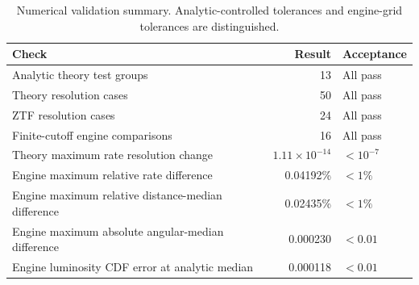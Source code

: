 \begin{table}[H]\centering\small
\renewcommand{\arraystretch}{1.15}
\caption{Numerical validation summary. Analytic-controlled tolerances and engine-grid tolerances are distinguished.}
\begin{tabular}{@{}lrl@{}}
\toprule
Check & Result & Acceptance \\\midrule
Analytic theory test groups & 13 & All pass \\
Theory resolution cases & 50 & All pass \\
ZTF resolution cases & 24 & All pass \\
Finite-cutoff engine comparisons & 16 & All pass \\
Theory maximum rate resolution change & $1.11\times10^{-14}$ & $<10^{-7}$ \\
Engine maximum relative rate difference & 0.04192\% & $<1\%$ \\
Engine maximum relative distance-median difference & 0.02435\% & $<1\%$ \\
Engine maximum absolute angular-median difference & 0.000230 & $<0.01$ \\
Engine luminosity CDF error at analytic median & 0.000118 & $<0.01$ \\
\bottomrule\end{tabular}\end{table}

